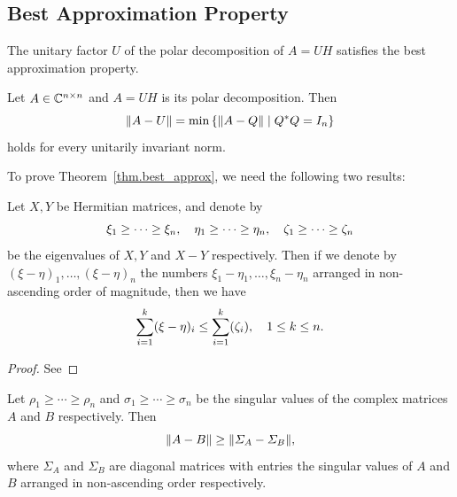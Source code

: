 \subsection{Best Approximation Property}

The unitary factor $U$ of the polar decomposition of $A = UH$ satisfies the best approximation property.

\begin{theorem}
    \label{thm.best_approx}
    Let $A\in\mathbb{C}^{n\times n}$ and $A= UH$ is its polar decomposition. Then 
    \begin{equation}\notag
        \|{A-U}\| = \min\left\{\|{A-Q}\|\mid Q^* Q = I_n\right\}
    \end{equation}
    holds for every unitarily invariant norm.
\end{theorem}

To prove Theorem~\ref{thm.best_approx}, we need the following two results:

\begin{lemma}
    \label{lemma.3.2}
    Let $X, Y$ be Hermitian matrices, and denote by 
    \begin{equation}\notag
        \xi_1\geq \cdots \geq \xi_n,\quad 
        \eta_1 \geq \cdots \geq \eta_n,\quad 
        \zeta_1\geq \cdots \geq \zeta_n
    \end{equation}
    be the eigenvalues of $X, Y$ and $X-Y$ respectively. Then if we denote by $(\xi-\eta)_1,\dots,(\xi-\eta)_n$ the numbers $\xi_1 -\eta_1,\dots,\xi_n-\eta_n$ arranged in non-ascending order of magnitude, then we have
    \begin{equation}\notag
        \sum_{i=1}^k (\xi-\eta)_i \leq \sum_{i=1}^k(\zeta_i), \quad 1\leq k\leq n.
    \end{equation}
\end{lemma}

\begin{proof}
    See 
\end{proof}

\begin{theorem}
    \label{thm.3.3}
    Let $\rho_1\geq \cdots\geq\rho_n$ and $\sigma_1\geq \cdots\geq \sigma_n$ be the singular values of the complex matrices $A$ and $B$ respectively. Then 
    \begin{equation}\notag
        \|{A-B}\|\geq \|{\varSigma_A - \varSigma_B}\|,
    \end{equation}
    where $\Sigma_A$ and $\Sigma_B$ are diagonal matrices with entries the singular values of $A$ and $B$ arranged in non-ascending order respectively.
\end{theorem}

